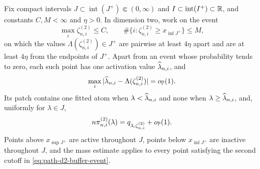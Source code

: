 \begin{proposition}
\label{prop:path-uniform-activation}
Fix compact intervals
\(J\subset\operatorname{int}(J^+)\Subset(0,\infty)\) and
\(I\subset\operatorname{int}(I^+)\subset\mathbb R\), and constants
\(C,M<\infty\) and \(\eta>0\). In dimension two, work on the event
\begin{equation}
\label{eq:path-d2-buffer-event}
 \max_i\zeta_{n,i}^{(2)}\le C,
 \qquad
 \#\{i:\zeta_{n,i}^{(2)}\ge x_{\inf J^+}\}\le M,
\end{equation}
on which the values \(\Lambda(\zeta_{n,i}^{(2)})\in J^+\) are pairwise at
least \(4\eta\) apart and are at least \(4\eta\) from the endpoints of
\(J^+\). Apart from an event whose probability tends to zero, each such point
has one activation value
\(\widehat\lambda_{n,i}\), and
\begin{equation}
\label{eq:path-d2-activation}
 \max_i|\widehat\lambda_{n,i}-\Lambda(\zeta_{n,i}^{(2)})|=o_{\mathbb P}(1).
\end{equation}
Its patch contains one fitted atom when
\(\lambda<\widehat\lambda_{n,i}\) and none when
\(\lambda\ge\widehat\lambda_{n,i}\), and, uniformly for \(\lambda\in J\),
\begin{equation}
\label{eq:path-d2-patch-mass}
 n\pi_{n,i}^{(2)}(\lambda)
 =q_{\lambda,\zeta_{n,i}^{(2)}}+o_{\mathbb P}(1).
\end{equation}
Points above \(x_{\sup J^+}\) are active throughout \(J\), points below
\(x_{\inf J^+}\) are inactive throughout \(J\), and the mass estimate applies
to every point satisfying the second cutoff in
\eqref{eq:path-d2-buffer-event}.


\end{proposition}

